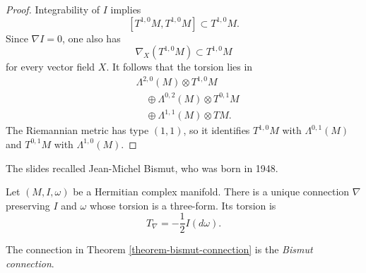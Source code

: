\begin{proof}
Integrability of $I$ implies
$$
[T^{1,0}M,T^{1,0}M]\subset T^{1,0}M.
$$
Since $\nabla I=0$, one also has
$$
\nabla_X(T^{1,0}M)\subset T^{1,0}M
$$
for every vector field $X$. It follows that
the torsion lies in
$$
\begin{aligned}
&\Lambda^{2,0}(M)\otimes T^{1,0}M\\
&\quad\oplus\Lambda^{0,2}(M)
\otimes T^{0,1}M\\
&\quad\oplus\Lambda^{1,1}(M)\otimes TM.
\end{aligned}
$$
The Riemannian metric has type $(1,1)$, so
it identifies $T^{1,0}M$ with
$\Lambda^{0,1}(M)$ and $T^{0,1}M$ with
$\Lambda^{1,0}(M)$.
\end{proof}

The slides recalled Jean-Michel Bismut,
who was born in 1948.

\begin{theorem}[Bismut]
\label{theorem-bismut-connection}
Let $(M,I,\omega)$ be a Hermitian complex
manifold. There is a unique connection
$\nabla$ preserving $I$ and $\omega$ whose
torsion is a three-form. Its torsion is
$$
T_\nabla=-\frac{1}{2}I(d\omega).
$$
\end{theorem}

\begin{definition}
\label{definition-bismut-connection}
The connection in Theorem
\ref{theorem-bismut-connection} is the
{\it Bismut connection}.
\end{definition}

